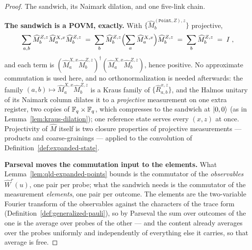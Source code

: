 \begin{proof}
\leanok
{}
The sandwich, its Naimark dilation, and one five-link chain.

\textbf{The sandwich is a POVM, exactly.} With $\{\widehat{M}^{(\mathtt{Point}, Z), z}_b\}$
projective,
\begin{equation*}
  \sum_{a, b} \widehat{M}^{Z, z}_b \widehat{M}^{X, x}_a \widehat{M}^{Z, z}_b
    \;=\; \sum_b \widehat{M}^{Z, z}_b \Bigl(\sum_a \widehat{M}^{X, x}_a\Bigr)
      \widehat{M}^{Z, z}_b
    \;=\; \sum_b \widehat{M}^{Z, z}_b \;=\; I\;,
\end{equation*}
and each term is $(\widehat{M}^{X, x}_a \widehat{M}^{Z, z}_b)^\dagger
(\widehat{M}^{X, x}_a \widehat{M}^{Z, z}_b)$, hence positive. No approximate commutation is used
here, and no orthonormalization is needed afterwards: the family
$(a, b) \mapsto \widehat{M}^{X, x}_a \widehat{M}^{Z, z}_b$ is a Kraus family of
$\{\widehat{R}^{x, z}_{a, b}\}$, and the Halmos unitary of its Naimark column dilates it to a
\emph{projective} measurement on one extra register, two copies of $\mathbb{F}_q \times \mathbb{F}_q$, which
compresses to the sandwich at $|0, 0\rangle$ (as in Lemma~\ref{lem:kraus-dilation}); one reference
state serves every $(x, z)$ at once. Projectivity of $\widehat{M}$ itself is two closure
properties of projective measurements --- products and coarse-grainings --- applied to the
convolution of Definition~\ref{def:expanded-state}.

\textbf{Parseval moves the commutation input to the elements.} What
Lemma~\ref{lem:qld-expanded-points} bounds is the commutator of the \emph{observables}
$\widehat{W}^{r}(u)$, one pair per probe; what the sandwich needs is the commutator of the
measurement \emph{elements}, one pair per outcome. The elements are the two-variable Fourier
transform of the observables against the characters of the trace form
(Definition~\ref{def:generalized-pauli}), so by Parseval the sum over outcomes of the one is the
average over probes of the other --- and the content already averages over the probes uniformly
and independently of everything else it carries, so that average is free.


\end{proof}

